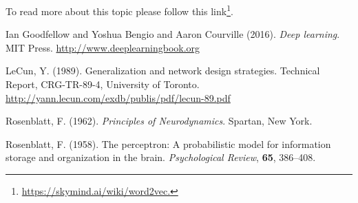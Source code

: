 \documentclass[12pt]{article}
\theoremstyle{plain}
\begin{document}
To read more about this topic please follow this link\footnote{\url{https://skymind.ai/wiki/word2vec.}}.

\newpage

\begin{thebibliography}{Nature}
%

\hypertarget{Deeplea_Goodfellow}{}
Ian Goodfellow and Yoshua Bengio and Aaron Courville (2016). \textit{Deep learning}. MIT Press. \url{http://www.deeplearningbook.org}

\hypertarget{Deeplea_LeCun_1}{}
LeCun, Y. (1989). Generalization and network design strategies. Technical Report, CRG-TR-89-4, University of Toronto. \url{http://yann.lecun.com/exdb/publis/pdf/lecun-89.pdf}

\hypertarget{Deeplea_Rosenblatt_2}{}
Rosenblatt, F. (1962). \textit{Principles of Neurodynamics}. Spartan, New York.

\hypertarget{Deeplea_Rosenblatt_1}{}
Rosenblatt, F. (1958). The perceptron: A probabilistic model for information storage and organization in the brain. \textit{Psychological Review}, \textbf{65}, 386–408.
\end{thebibliography}
\end{document}
